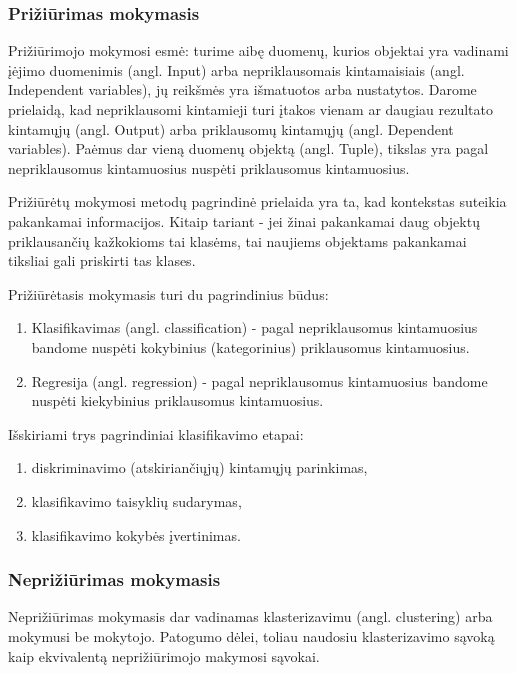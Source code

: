 \subsubsection{Prižiūrimas mokymasis}

Prižiūrimojo mokymosi esmė: turime aibę duomenų, kurios objektai yra vadinami
įėjimo duomenimis (angl. Input) arba nepriklausomais kintamaisiais (angl.
Independent variables), jų reikšmės yra išmatuotos arba nustatytos. Darome prielaidą, 
kad nepriklausomi kintamieji turi įtakos vienam ar daugiau rezultato kintamųjų 
(angl. Output) arba priklausomų kintamųjų (angl. Dependent variables). Paėmus dar vieną 
duomenų objektą (angl. Tuple), tikslas yra pagal nepriklausomus kintamuosius nuspėti priklausomus kintamuosius.

Prižiūrėtų mokymosi metodų pagrindinė prielaida yra ta, kad kontekstas suteikia pakankamai 
informacijos. Kitaip tariant - jei žinai pakankamai daug objektų priklausančių kažkokioms tai 
klasėms, tai naujiems objektams pakankamai tiksliai gali priskirti tas klases.

Prižiūrėtasis mokymasis turi du pagrindinius būdus:
\begin{enumerate}
  \item Klasifikavimas (angl. classification) - pagal nepriklausomus
  kintamuosius bandome nuspėti kokybinius (kategorinius) priklausomus kintamuosius. 
  \item Regresija (angl. regression) - pagal nepriklausomus kintamuosius bandome
  nuspėti kiekybinius priklausomus kintamuosius.
\end{enumerate}

Išskiriami trys pagrindiniai klasifikavimo etapai:
\begin{enumerate}
  \item diskriminavimo (atskiriančiųjų) kintamųjų parinkimas,
  \item klasifikavimo taisyklių sudarymas,
  \item klasifikavimo kokybės įvertinimas.
\end{enumerate}

\subsubsection{Neprižiūrimas mokymasis}

Neprižiūrimas mokymasis dar vadinamas klasterizavimu (angl. clustering) arba
mokymusi be mokytojo. Patogumo dėlei, toliau naudosiu klasterizavimo sąvoką kaip
ekvivalentą neprižiūrimojo makymosi sąvokai.

